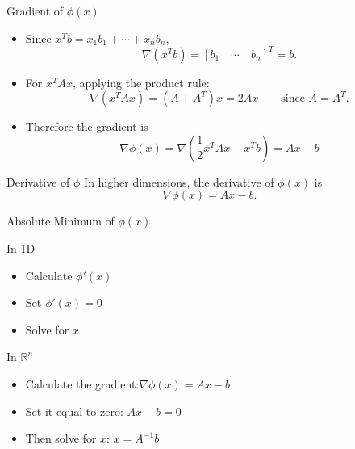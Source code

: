 \documentclass[10pt]{beamer}
\begin{document}
\begin{frame}{Gradient of $\phi(x)$}

\begin{itemize}
    \item Since \( x^T b = x_1 b_1 + \cdots + x_n b_n \),  
    \[
    \nabla (x^T b) = [b_1 \quad \cdots \quad  b_n ]^T = b.
    \]
    \item For \( x^T A x \), applying the product rule:
    \[
        \nabla(x^TAx)=(A+A^T)x=2Ax
        \qquad \text{since } A=A^T.
    \]
    \item Therefore the gradient is 
    $$\nabla \phi(x)=\nabla( \frac{1}{2} x^T A x - x^T b) = Ax-b $$
\end{itemize}

\begin{block}{Derivative of $\phi$}
In higher dimensions, the derivative of $\phi(x)$ is 
\[
\nabla \phi(x) = Ax - b.
\]
\end{block}

\end{frame}

\begin{frame}{Absolute Minimum of \( \phi(x) \)}

\begin{block}{In 1D}
    \begin{itemize}
        \item Calculate $\phi'(x)$
        \item Set $\phi'(x)=0$
        \item Solve for $x$
    \end{itemize}
\end{block}

\vfill

\begin{block}{In $\mathbb{R}^n$}
    \begin{itemize}
        \item Calculate the gradient:\quad  $\nabla \phi(x) = Ax-b$
        \item Set it equal to zero: \quad\quad$Ax-b=0$
        \item Then solve for $x$: \;\qquad\quad$x = A^{-1}b$
    \end{itemize} 
\end{block}

\vfill 



\end{frame}
\end{document}

